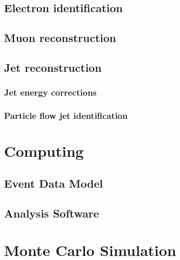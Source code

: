 \subsection{Electron identification}

\subsection{Muon reconstruction}

\subsection{Jet reconstruction}

\subsubsection{Jet energy corrections}

\subsubsection{Particle flow jet identification}

\section{Computing}

\subsection{Event Data Model}

\subsection{Analysis Software}

\section{Monte Carlo Simulation}


